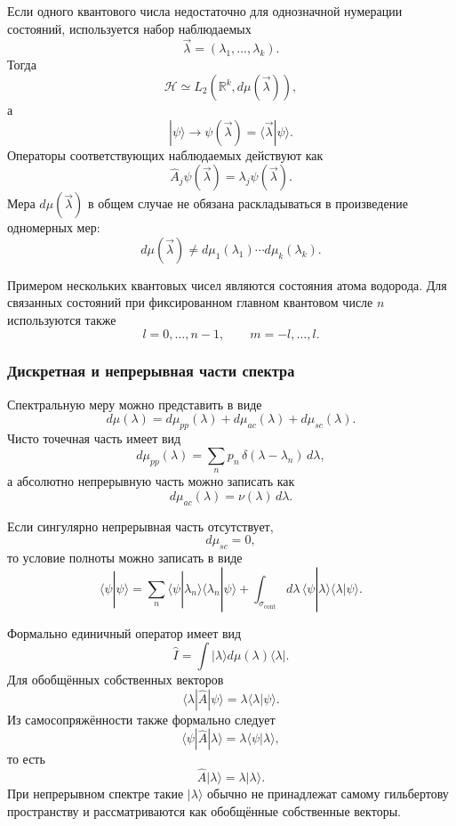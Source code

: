 \documentclass[12pt,a4paper]{article}
\begin{document}
Если одного квантового числа недостаточно для однозначной нумерации
состояний, используется набор наблюдаемых
\[
    \vec\lambda
    =
    (\lambda_1,\ldots,\lambda_k).
\]
Тогда
\[
    \mathcal H
    \simeq
    L_2(\mathbb R^k,d\mu(\vec\lambda)),
\]
а
\[
    |\psi\rangle
    \longrightarrow
    \psi(\vec\lambda)
    =
    \langle\vec\lambda|\psi\rangle.
\]
Операторы соответствующих наблюдаемых действуют как
\[
    \boxed{
        \hat A_j\psi(\vec\lambda)
        =
        \lambda_j\psi(\vec\lambda)
    }.
\]
Мера $d\mu(\vec\lambda)$ в общем случае не обязана раскладываться в
произведение одномерных мер:
\[
    d\mu(\vec\lambda)
    \neq
    d\mu_1(\lambda_1)
    \cdots
    d\mu_k(\lambda_k).
\]

Примером нескольких квантовых чисел являются состояния атома
водорода. Для связанных состояний при фиксированном главном квантовом
числе $n$ используются также
\[
    l=0,\ldots,n-1,
    \qquad
    m=-l,\ldots,l.
\]


\subsubsection{Дискретная и непрерывная части спектра}

Спектральную меру можно представить в виде
\[
    \boxed{
        d\mu(\lambda)
        =
        d\mu_{pp}(\lambda)
        +
        d\mu_{ac}(\lambda)
        +
        d\mu_{sc}(\lambda)
    }.
\]
Чисто точечная часть имеет вид
\[
    d\mu_{pp}(\lambda)
    =
    \sum_n
        p_n\,
        \delta(\lambda-\lambda_n)\,d\lambda,
\]
а абсолютно непрерывную часть можно записать как
\[
    d\mu_{ac}(\lambda)
    =
    \nu(\lambda)\,d\lambda.
\]

Если сингулярно непрерывная часть отсутствует,
\[
    d\mu_{sc}=0,
\]
то условие полноты можно записать в виде
\[
\boxed{
\langle\psi|\psi\rangle
=
\sum_n
    \langle\psi|\lambda_n\rangle
    \langle\lambda_n|\psi\rangle
+
\int_{\sigma_{\mathrm{cont}}}
    d\lambda\,
    \langle\psi|\lambda\rangle
    \langle\lambda|\psi\rangle
}.
\]

Формально единичный оператор имеет вид
\[
    \boxed{
        \hat I
        =
        \int
            |\lambda\rangle
            d\mu(\lambda)
            \langle\lambda|
    }.
\]
Для обобщённых собственных векторов
\[
    \langle\lambda|\hat A|\psi\rangle
    =
    \lambda\langle\lambda|\psi\rangle.
\]
Из самосопряжённости также формально следует
\[
    \langle\psi|\hat A|\lambda\rangle
    =
    \lambda\langle\psi|\lambda\rangle,
\]
то есть
\[
    \boxed{
        \hat A|\lambda\rangle
        =
        \lambda|\lambda\rangle
    }.
\]
При непрерывном спектре такие $|\lambda\rangle$ обычно не принадлежат
самому гильбертову пространству и рассматриваются как обобщённые
собственные векторы.
\end{document}
